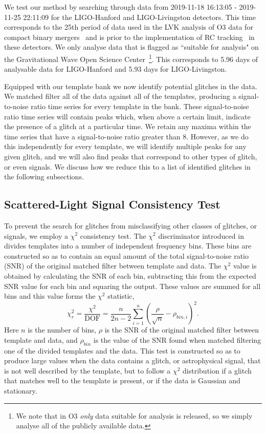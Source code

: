 We test our method by searching through \gw{} data from 2019-11-18 16:13:05 - 2019-11-25 22:11:09 for the LIGO-Hanford and LIGO-Livingston detectors. This time corresponds to the 25th period of data used in the LVK analysis of O3 data for compact binary mergers~\cite{gwtc3} and is prior to the implementation of RC tracking~\cite{reducing_scattering_o3} in these detectors. We only analyse data that is flagged as ``suitable for analysis" on the Gravitational Wave Open Science Center~\cite{GWOSC}\footnote{We note that in O3 \emph{only} data suitable for analysis is released, so we simply analyse all of the publicly available data.}. This corresponds to 5.96 days of analysable data for LIGO-Hanford and 5.93 days for LIGO-Livingston.

Equipped with our template bank we now identify potential \scl{} glitches in the data. We matched filter all of the data against all of the templates, producing a signal-to-noise ratio time series for every template in the bank. These signal-to-noise ratio time series will contain peaks which, when above a certain limit, indicate the presence of a \scl{} glitch at a particular time. We retain any maxima within the time series that have a signal-to-noise ratio greater than 8. However, as we do this independently for every template, we will identify multiple peaks for any given glitch, and we will also find peaks that correspond to other types of glitch, or even \gw{} signals. We discuss how we reduce this to a list of identified \scl{} glitches in the following subsections.

\subsection{Scattered-Light Signal Consistency Test}

To prevent the search for \scl{} glitches from misclassifying other classes of glitches, or \gw{} signals, we employ a $\chi^2$ consistency test. The $\chi^2$ discriminator introduced in \cite{Allen_2005} divides \gw{} templates into a number of independent frequency bins. These bins are constructed so as to contain an equal amount of the total signal-to-noise ratio (SNR) of the original matched filter between template and data. The $\chi^{2}$ value is obtained by calculating the SNR of each bin, subtracting this from the expected SNR value for each bin and squaring the output. These values are summed for all bins and this value forms the $\chi^{2}$ statistic,
%
\begin{equation}
  \chi_{r}^{2} = \frac{\chi^{2}}{\textrm{DOF}} = \frac{n}{2n - 2} \sum_{i=1}^n \left(\frac{\rho}{\sqrt{n}} - \rho_{bin,i}\right)^2.
  \label{eqn:chi_squared}
\end{equation}
%
Here $n$ is the number of bins, $\rho$ is the SNR of the original matched filter between template and data, and $\rho_{bin}$ is the value of the SNR found when matched filtering one of the divided templates and the data. This test is constructed so as to produce large values when the data contains a glitch, or astrophysical signal, that is not well described by the template, but to follow a $\chi^2$ distribution if a glitch that matches well to the template is present, or if the data is Gaussian and stationary.

